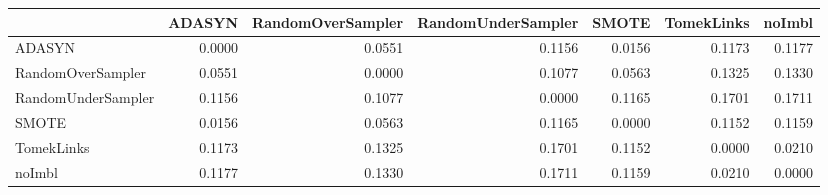 \begin{tabular}{lrrrrrr}
\toprule
 & ADASYN & RandomOverSampler & RandomUnderSampler & SMOTE & TomekLinks & noImbl \\
\midrule
ADASYN & 0.0000 & 0.0551 & 0.1156 & 0.0156 & 0.1173 & 0.1177 \\
RandomOverSampler & 0.0551 & 0.0000 & 0.1077 & 0.0563 & 0.1325 & 0.1330 \\
RandomUnderSampler & 0.1156 & 0.1077 & 0.0000 & 0.1165 & 0.1701 & 0.1711 \\
SMOTE & 0.0156 & 0.0563 & 0.1165 & 0.0000 & 0.1152 & 0.1159 \\
TomekLinks & 0.1173 & 0.1325 & 0.1701 & 0.1152 & 0.0000 & 0.0210 \\
noImbl & 0.1177 & 0.1330 & 0.1711 & 0.1159 & 0.0210 & 0.0000 \\
\bottomrule
\end{tabular}
